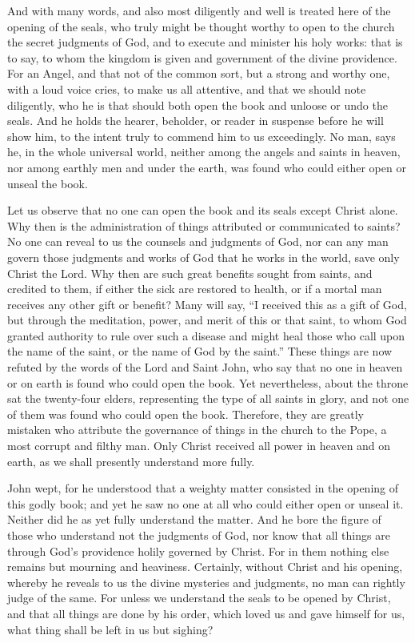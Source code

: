 And with many words, and also most diligently and well is treated here of the opening of the seals, who truly might be thought worthy to open to the church the secret judgments of God, and to execute and minister his holy works: that is to say, to whom the kingdom is given and government of the divine providence. For an Angel, and that not of the common sort, but a strong and worthy one, with a loud voice cries, to make us all attentive, and that we should note diligently, who he is that should both open the book and unloose or undo the seals. And he holds the hearer, beholder, or reader in suspense before he will show him, to the intent truly to commend him to us exceedingly. No man, says he, in the whole universal world, neither among the angels and saints in heaven, nor among earthly men and under the earth, was found who could either open or unseal the book.

Let us observe that no one can open the book and its seals except Christ alone. Why then is the administration of things attributed or communicated to saints? No one can reveal to us the counsels and judgments of God, nor can any man govern those judgments and works of God that he works in the world, save only Christ the Lord. Why then are such great benefits sought from saints, and credited to them, if either the sick are restored to health, or if a mortal man receives any other gift or benefit? Many will say, “I received this as a gift of God, but through the meditation, power, and merit of this or that saint, to whom God granted authority to rule over such a disease and might heal those who call upon the name of the saint, or the name of God by the saint.” These things are now refuted by the words of the Lord and Saint John, who say that no one in heaven or on earth is found who could open the book. Yet nevertheless, about the throne sat the twenty-four elders, representing the type of all saints in glory, and not one of them was found who could open the book. Therefore, they are greatly mistaken who attribute the governance of things in the church to the Pope, a most corrupt and filthy man. Only Christ received all power in heaven and on earth, as we shall presently understand more fully.

John wept, for he understood that a weighty matter consisted in the opening of this godly book; and yet he saw no one at all who could either open or unseal it. Neither did he as yet fully understand the matter. And he bore the figure of those who understand not the judgments of God, nor know that all things are through God’s providence holily governed by Christ. For in them nothing else remains but mourning and heaviness. Certainly, without Christ and his opening, whereby he reveals to us the divine mysteries and judgments, no man can rightly judge of the same. For unless we understand the seals to be opened by Christ, and that all things are done by his order, which loved us and gave himself for us, what thing shall be left in us but sighing?

